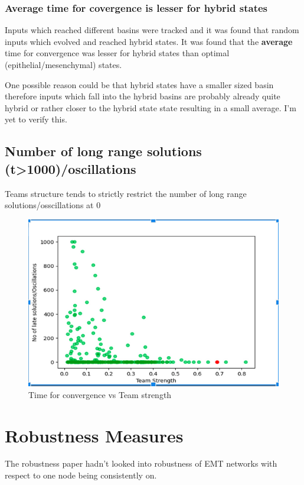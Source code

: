 \documentclass{report}
\begin{document}
\subsubsection{Average time for covergence is lesser for hybrid states} 
Inputs which reached different basins were tracked and it was found that random inputs which evolved and reached hybrid states. It was found that the \textbf{ average } time for convergence was lesser for hybrid states than optimal (epithelial/mesenchymal) states. 

One possible reason could be that hybrid states have a smaller sized basin therefore inputs which fall into the hybrid basins are probably already quite hybrid or rather closer to the hybrid state state resulting in a small average. I'm yet to verify this. 

\subsection{Number of long range solutions (t>1000)/oscillations }
Teams structure tends to strictly restrict the number of long range solutions/osscillations at 0  
\begin{figure}[H]\centering 
	\includegraphics[scale=0.4]{img/time_for_covg_vs_teamstrength.png}
	\caption{Time for convergence vs Team strength}


\end{figure}

\section{Robustness Measures}
The robustness paper hadn't looked into robustness of EMT networks with respect to one node being consistently on.
\end{document}
